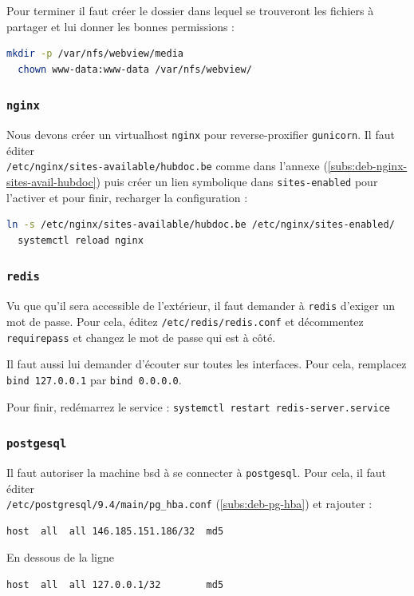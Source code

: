 \documentclass[10pt,a4paper]{article}
\begin{document}
Pour terminer il faut créer le dossier dans lequel se trouveront les fichiers à partager et lui donner les bonnes permissions :
\begin{lstlisting}[language=bash]
  mkdir -p /var/nfs/webview/media
  chown www-data:www-data /var/nfs/webview/
\end{lstlisting}

\subsubsection{\texttt{nginx}}

Nous devons créer un virtualhost \texttt{nginx} pour reverse-proxifier \texttt{gunicorn}.
Il faut éditer \\\texttt{/etc/nginx/sites-available/hubdoc.be} comme dans l'annexe (\ref{subs:deb-nginx-sites-avail-hubdoc})
puis créer un lien symbolique dans \texttt{sites-enabled} pour l'activer et pour finir,
recharger la configuration :
\begin{lstlisting}[language=bash]
  ln -s /etc/nginx/sites-available/hubdoc.be /etc/nginx/sites-enabled/
  systemctl reload nginx
\end{lstlisting}

\subsubsection{\texttt{redis}}

Vu que qu'il sera accessible de l'extérieur,
il faut demander à \texttt{redis} d'exiger un mot de passe.
Pour cela, éditez \texttt{/etc/redis/redis.conf} et décommentez \texttt{requirepass}
et changez le mot de passe qui est à côté.

Il faut aussi lui demander d'écouter sur toutes les interfaces.
Pour cela, remplacez \texttt{bind 127.0.0.1} par \texttt{bind 0.0.0.0}.

Pour finir, redémarrez le service : \texttt{systemctl restart redis-server.service}


\subsubsection{\texttt{postgesql}}

Il faut autoriser la machine bsd à se connecter à \texttt{postgesql}.
Pour cela, il faut éditer \\\texttt{/etc/postgresql/9.4/main/pg\_hba.conf} (\ref{subs:deb-pg-hba}) et rajouter :
\begin{lstlisting}[language=bash]
  host  all  all 146.185.151.186/32  md5
\end{lstlisting}
En dessous de la ligne
\begin{lstlisting}[language=bash]
  host  all  all 127.0.0.1/32        md5
\end{lstlisting}
\end{document}
